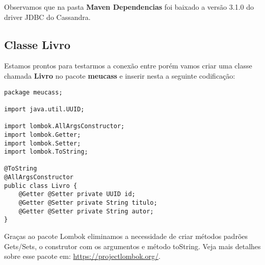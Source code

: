 Observamos que na pasta \textbf{Maven Dependencias} foi baixado a versão 3.1.0 do driver JDBC do Cassandra.

\subsection{Classe Livro}
Estamos prontos para testarmos a conexão entre porém vamos criar uma classe chamada \textbf{Livro} no pacote \textbf{meucass} e inserir nesta a seguinte codificação:
\begin{lstlisting}[]
package meucass;

import java.util.UUID;

import lombok.AllArgsConstructor;
import lombok.Getter;
import lombok.Setter;
import lombok.ToString;

@ToString
@AllArgsConstructor
public class Livro {
	@Getter @Setter private UUID id;
	@Getter @Setter private String titulo;
	@Getter @Setter private String autor;
}
\end{lstlisting}

Graças ao pacote Lombok eliminamos a necessidade de criar métodos padrões Gets/Sets, o construtor com os argumentos e método toString. Veja mais detalhes sobre esse pacote em: \url{https://projectlombok.org/}.

